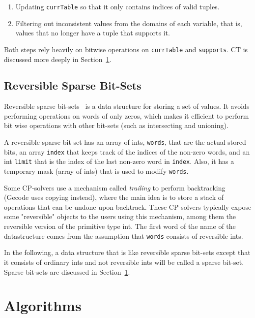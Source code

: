 \documentclass[a4paper,11pt]{article}
\newcommand{\T}[1]{\texttt{#1}}
\newcommand{\Secref}[1]{Section~\ref{#1}}
\newcommand{\CTpaper}[0]{DBLP:conf/cp/DemeulenaereHLP16}
\numberwithin{equation}{section}
\begin{document}
\begin{enumerate}
  \item Updating \texttt{currTable} so that it only contains indices
    of valid tuples.
  \item Filtering out inconsistent values from the domains of each
    variable, that is,
    values that no longer have a tuple that supports it.
\end{enumerate}

Both steps rely heavily on bitwise operations on \T{currTable} and
\T{supports}. CT is discussed more deeply in \Secref{sec:algorithms}.

\subsection{Reversible Sparse Bit-Sets}
\label{bg:sbs}
Reversible sparse bit-sets~\cite{\CTpaper} 
is a data structure for storing 
a set of values. It avoids performing operations on words of only zeros,
which makes it efficient to perform bit wise operations
with other bit-sets (such as intersecting and unioning).

A reversible sparse bit-set has an array of ints, \T{words},
that are the actual stored bits, an array \T{index} that
keeps track of the indices of the non-zero words, and an
int \T{limit} that is the index of the last non-zero word
in \T{index}. Also, it has a temporary mask (array of ints)
that is used to modify \T{words}.

Some CP-solvers
use a mechanism called \emph{trailing} to perform backtracking
(Gecode uses copying instead),
where the main idea is to store a stack of operations that can
be undone upon backtrack.
These CP-solvers typically expose
some "reversible" objects to the users using this mechanism,
among them the reversible version of the primitive type int.
The first word of the name of the datastructure comes from
the assumption that \T{words} consists of
reversible ints.

In the following, a data structure that is 
like reversible sparse bit-sets except that it consists 
of ordinary ints and not reversible ints
will be called a sparse bit-set. Sparse bit-sets are discussed
in \Secref{sec:algorithms}.


\section{Algorithms}
\label{sec:algorithms}
\end{document}
